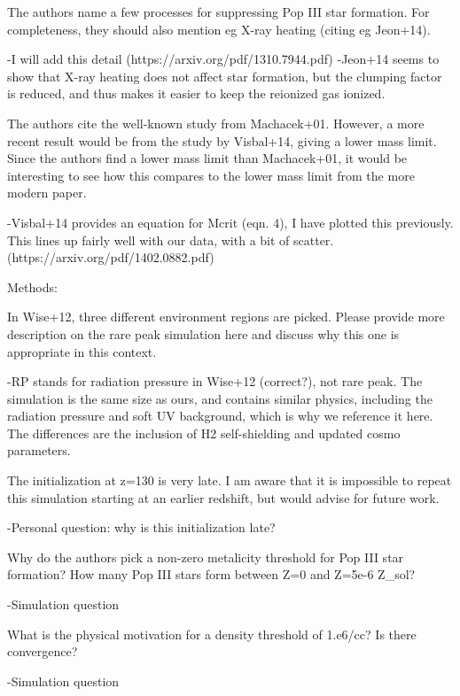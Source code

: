 \documentclass[11pt]{article}
\newenvironment{referee}[1][]{%
    \ignorespaces%
    \begin{mdframed}[style=myquotestyle,#1]%
}{%
    \end{mdframed}%
    \ignorespacesafterend%
}%
\begin{document}
\begin{referee}
The authors name a few processes for suppressing Pop III star formation. For completeness, they should also mention eg X-ray heating (citing eg Jeon+14).
\end{referee}
-I will add this detail (https://arxiv.org/pdf/1310.7944.pdf)
-Jeon+14 seems to show that X-ray heating does not affect star formation, but 
the clumping factor is reduced, and thus makes it easier to keep the reionized 
gas ionized. 

\begin{referee}
The authors cite the well-known study from Machacek+01. However, a more recent result would be from the study by Visbal+14, giving a lower mass limit. Since the authors find a lower mass limit than Machacek+01, it would be interesting to see how this compares to the lower mass limit from the more modern paper.
\end{referee}
-Visbal+14 provides an equation for Mcrit (eqn. 4), I have plotted this previously. This lines up fairly well with our data, with a bit of scatter.  (https://arxiv.org/pdf/1402.0882.pdf) 

\begin{referee}
Methods:

In Wise+12, three different environment regions are picked. Please provide more description on the rare peak simulation here and discuss why this one is appropriate in this context.
\end{referee}
-RP stands for radiation pressure in Wise+12 (correct?), not rare peak. The simulation is the same size as ours, and contains similar physics, including the radiation pressure and soft UV background, which is why we reference it here. The differences are the inclusion of H2 self-shielding and updated cosmo parameters.

\begin{referee}
The initialization at z=130 is very late. I am aware that it is impossible to 
repeat this simulation starting at an earlier redshift, but would advise for 
future work.
\end{referee}
-Personal question: why is this initialization late?

\begin{referee}
Why do the authors pick a non-zero metalicity threshold for Pop III star formation? How many Pop III stars form between Z=0 and Z=5e-6 Z\_sol?
\end{referee}
-Simulation question


\begin{referee}
What is the physical motivation for a density threshold of 1.e6/cc? Is there convergence?
\end{referee}
-Simulation question
\end{document}
